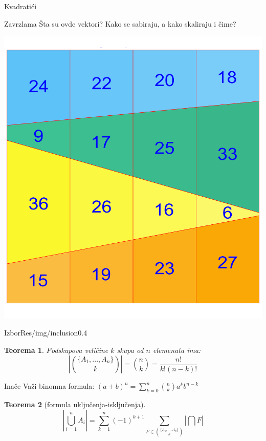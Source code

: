 \documentclass{beamer}
\newtheorem*{teo}{Teorema}
\newenvironment{thinker}{\begin{alertblock}{Zavrzlama}}{\end{alertblock}}
\newenvironment{sidenote}{\begin{alertblock}{Inače}}{\end{alertblock}}
\begin{document}
    \begin{frame}{Kvadratići}
        \begin{thinker}
            Šta su ovde vektori? Kako se sabiraju, a kako skaliraju i čime?
        \end{thinker}
        \includegraphics[height=\textheight]{Res/img/magic_square}
    \end{frame}
    
    \begin{framebg}{Izbor}{Res/img/inclusion}{0.4}
        \begin{teo}
            Podskupova veličine $k$ skupa od $n$ elemenata ima:
            $$ \left| \binom{\{A_1,...,A_n\}} k \right| = \binom n k = \frac {n!} {k! (n-k)!}
            $$
        \end{teo}
        \pause
        \begin{sidenote}
        Važi binomna formula: $(a + b)^n = \sum_{k=0}^n \binom n k a^k b^{n-k}$
        \end{sidenote}
        \pause
        \begin{teo}[formula uključenja-isključenja]
            $$\left| \bigcup_{i=1}^n A_i\right| = 
             \sum_{k=1}^n (-1)^{k+1}\sum_{F \in \binom{\{A_1,...,A_n\}} k} \left| \bigcap F \right|
            $$
        \end{teo}

    \end{framebg}
\end{document}
